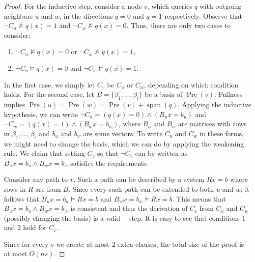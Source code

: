 \documentclass[10pt,a4paper]{article}
\theoremstyle{definition}
\theoremstyle{remark}
\DeclareMathOperator{\Span}{span}
\DeclareMathOperator{\pre}{Pre}
\DeclareMathOperator{\reslin}{\mathsf{Res}[\oplus]}
\begin{document}
\begin{proof}
  For the inductive step, consider a node $v$, which queries $q$ with outgoing neighbors $u$ and $w$, in the directions $q=0$ and $q=1$ respectively. Observe that $\neg C_u \not \models q(x) = 1$ and $\neg C_w \not \models q(x) = 0$. Thus, there are only two cases to consider:
  \begin{enumerate}
    \item $\neg C_u \not \models q(x)=0$ or $\neg C_w \not \models q(x)=1$,
    \item $\neg C_u \models q(x)=0$ and $\neg C_w \models q(x)=1$.
  \end{enumerate}
  In the first case, we simply let $C_v$ be $C_u$ or $C_w$, depending on which condition holds. For the second case, let $B = \{\beta_1, \ldots, \beta_t\}$ be a basis of $\pre(v)$. Fullness implies $\pre(u) = \pre(w) = \pre(v) + \Span(q)$. Applying the inductive hypothesis, we can write $\neg C_u = (q(x)=0) \wedge (B_u x = b_u)$ and $\neg C_w = (q(x) = 1) \wedge (B_w x = b_w)$, where $B_u$ and $B_w$ are matrices with rows in $\beta_1, \ldots, \beta_t$ and $b_u$ and $b_w$ are some vectors. To write $C_u$ and $C_w$ in these forms, we might need to change the basis, which we can do by applying the weakening rule. We claim that setting $C_v$ so that $\neg C_v$ can be written as $B_u x= b_u \wedge B_w x = b_w$ satisfies the requirements.

  Consider any path to $v$. Such a path can be described by a system $Rx = b$ where rows in $R$ are from $B$. Since every such path can be extended to both $u$ and $w$, it follows that $B_u x = b_u \vDash Rx=b$ and $B_w x = b_w \vDash Rx = b$. This means that $B_u x = b_u \wedge B_w x = b_w$ is consistent and thus the derivation of $C_v$ from $C_u$ and $C_w$ (possibly changing the basis) is a valid $\reslin$ step. It is easy to see that conditions 1 and 2 hold for $C_v$.

  Since for every $v$ we create at most $2$ extra clauses, the total size of the proof is at most $O(ns)$.

 
\end{proof} 
\end{document}
